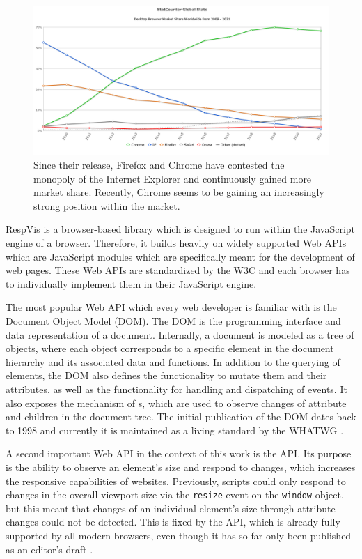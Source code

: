 \begin{figure}[tp]
\centering
\includegraphics[keepaspectratio,width=\linewidth,height=\fullh / 2]{diagrams/browser-market-share.pdf}
\caption[Desktop Browser Market Share]{
  Since their release, Firefox and Chrome have contested the monopoly of the Internet Explorer and continuously gained more market share. 
  Recently, Chrome seems to be gaining an increasingly strong position within the market. 
  }
\label{fig:BrowserMarketShare}
\end{figure}

RespVis is a browser-based library which is designed to run within the JavaScript engine of a browser. 
Therefore, it builds heavily on widely supported Web APIs which are JavaScript modules which are specifically meant for the development of web pages. 
These Web APIs are standardized by the W3C and each browser has to individually implement them in their JavaScript engine.

The most popular Web API which every web developer is familiar with is the Document Object Model (DOM). 
The DOM is the programming interface and data representation of a document. 
Internally, a document is modeled as a tree of objects, where each object corresponds to a specific element in the document hierarchy and its associated data and functions. 
In addition to the querying of elements, the DOM also defines the functionality to mutate them and their attributes, as well as the functionality for handling and dispatching of events. 
It also exposes the mechanism of s, which are used to observe changes of attribute and children in the document tree. 
The initial publication of the DOM dates back to 1998 \parencite{DOM1} and currently it is maintained as a living standard by the WHATWG \parencite{DOM}.

A second important Web API in the context of this work is the  API. 
Its purpose is the ability to observe an element's size and respond to changes, which increases the responsive capabilities of websites. 
Previously, scripts could only respond to changes in the overall viewport size via the \lstinline{resize} event on the \lstinline{window} object, but this meant that changes of an individual element's size through attribute changes could not be detected. 
This is fixed by the  API, which is already fully supported by all modern browsers, even though it has so far only been published as an editor's draft \parencite{ResizeObserver}.

